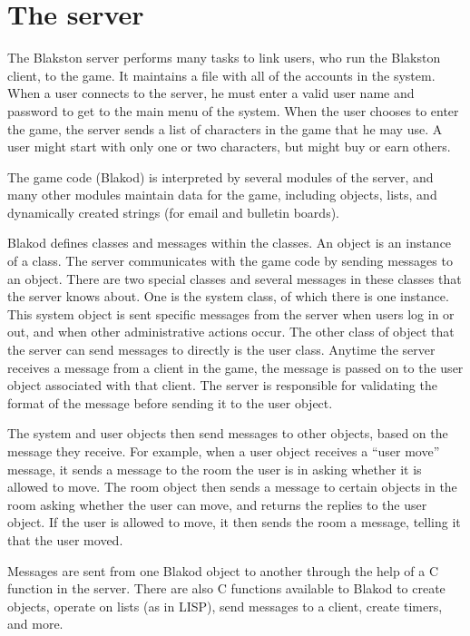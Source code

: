 \documentclass[12pt]{article}
\begin{document}
\section{The server}

The Blakston server performs many tasks to link users, who run the
Blakston client, to the game.  It maintains a file with all of the
accounts in the system.  When a user connects to the server, he must
enter a valid user name and password to get to the main menu of the
system.  When the user chooses to enter the game, the server sends a
list of characters in the game that he may use.  A user might start
with only one or two characters, but might buy or earn others.

The game code (Blakod) is interpreted by several modules of the
server, and many other modules maintain data for the game, including
objects, lists, and dynamically created strings (for email and
bulletin boards).

Blakod defines classes and messages within the classes.  An object is
an instance of a class.  The server communicates with the game code by
sending messages to an object.  There are two special classes and
several messages in these classes that the server knows about.  One is
the system class, of which there is one instance.  This system object
is sent specific messages from the server when users log in or out,
and when other administrative actions occur.  The other class of
object that the server can send messages to directly is the user
class.  Anytime the server receives a message from a client in the
game, the message is passed on to the user object associated with that
client.  The server is responsible for validating the format of the
message before sending it to the user object.

The system and user objects then send messages to other objects, based
on the message they receive.  For example, when a user object receives
a ``user move'' message, it sends a message to the room the user is in
asking whether it is allowed to move.  The room object then sends a
message to certain objects in the room asking whether the user can
move, and returns the replies to the user object.  If the user is
allowed to move, it then sends the room a message, telling it that the
user moved.

Messages are sent from one Blakod object to another through the help
of a C function in the server.  There are also C functions available
to Blakod to create objects, operate on lists (as in LISP), send
messages to a client, create timers, and more.
\end{document}

